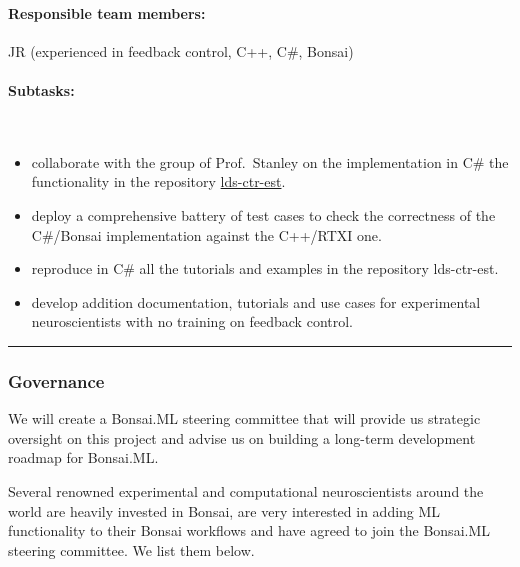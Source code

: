 \paragraph{Responsible team members:} JR (experienced in feedback control, C++,
C\#, Bonsai)

\paragraph{Subtasks:}\mbox{}\\

\begin{itemize}

    \item collaborate with the group of Prof.~Stanley on the implementation in
        C\# the functionality in the repository
        \href{https://github.com/CLOCTools/lds-ctrl-est}{lds-ctr-est}.

    \item deploy a comprehensive battery of test cases to check the correctness
        of the C\#/Bonsai implementation against the C++/RTXI one.

    \item reproduce in C\# all the tutorials and examples in the repository
        lds-ctr-est.

    \item develop addition documentation, tutorials and use cases for
        experimental neuroscientists with no training on feedback control.

\end{itemize}

\noindent\rule{\textwidth}{1pt}
\subsubsection*{Governance}

We will create a Bonsai.ML steering committee that will provide us strategic
oversight on this project and advise us on building a long-term development
roadmap for Bonsai.ML.

Several renowned experimental and computational neuroscientists around the
world are heavily invested in Bonsai, are very interested in adding ML
functionality to their Bonsai workflows and have agreed to join the Bonsai.ML
steering committee. We list them below.

